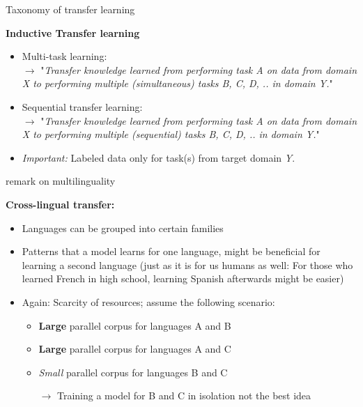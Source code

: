 
\begin{frame}{Taxonomy of transfer learning \href{https://ruder.io/thesis/}{}}

\vfill

	\textbf{Inductive Transfer learning}

	\begin{itemize}
		\item Multi-task learning:\\
					$\rightarrow$ "\textit{Transfer knowledge learned from performing task A on data from domain X to performing multiple (simultaneous) tasks B, C, D, .. in domain Y.}"\\\mbox{}
		\item Sequential transfer learning:\\
					$\rightarrow$ "\textit{Transfer knowledge learned from performing task A on data from domain X to performing multiple (sequential) tasks B, C, D, .. in domain Y.}"\\\mbox{}
		\item \textit{Important:} Labeled data only for task(s) from target domain \textit{Y}.
	\end{itemize}
	
\vfill

\end{frame}


\begin{frame}{remark on multilinguality}

\vfill

\textbf{Cross-lingual transfer:}

\begin{itemize}
	\item Languages can be grouped into certain families
	\item Patterns that a model learns for one language, might be beneficial for learning a second language 
				(just as it is for us humans as well: For those who learned French in high school, learning Spanish
				afterwards might be easier)
	\item Again: Scarcity of resources; assume the following scenario:
		\begin{itemize}
			\item \textbf{Large} parallel corpus for languages A and B
			\item \textbf{Large} parallel corpus for languages A and C
			\item \textit{Small} parallel corpus for languages B and C
			\item[$\to$] Training a model for B and C in isolation not the best idea
		\end{itemize}
\end{itemize}

\vfill

\end{frame}

